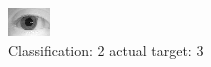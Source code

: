 \begin{figure}[h!]
\begin{center}
\includegraphics[width=0.60\columnwidth]{figures/ID1052_class_2_target_3.png}
\end{center}
\caption{ Classification: 2 actual target: 3}
\label{fig:ID1052_class_2_target_3}
\end{figure}
